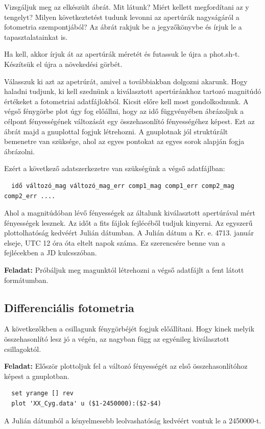 \documentclass{article}
\begin{document}
Vizsgáljuk meg az elkészült ábrát. Mit látunk? Miért kellett megfordítani az y
tengelyt? Milyen következtetést tudunk levonni az apertúrák nagyságáról a
fotometria szempontjából? Az ábrát rakjuk be a jegyzőkönyvbe és írjuk le a
tapasztalatainkat is.

Ha kell, akkor írjuk át az apertúrák méretét és futassuk le újra a phot.sh-t.
Készítsük el újra a növekedési görbét.

Válasszuk ki azt az apetrúrát, amivel a továbbiakban dolgozni akarunk.
Hogy haladni tudjunk, ki kell szednünk a kiválasztott apertúránkhoz tartozó
magnitúdó értékeket a fotometriai adatfájlokból.
Kicsit előre kell most gondolkodnunk. A végső fénygörbe plot úgy fog előállni,
hogy az idő függvényében ábrázoljuk a célpont fényességének változását egy
összehasonlító fényességéhez képest. Ezt az ábrát majd a gnuplottal fogjuk
létrehozni. A gnuplotnak jól struktúrált bemenetre van szüksége, ahol az egyes
pontokat az egyes sorok alapján fogja ábrázolni.

Ezért a következő adatszerkezetre van szükségünk a végső adatfájlban:
\begin{verbatim}
  idő változó_mag változó_mag_err comp1_mag comp1_err comp2_mag comp2_err ....
\end{verbatim}

Ahol a magnitúdóban lévő fényességek az általunk kiválasztott apertúrával mért
fényességek lesznek.
Az időt a fits fájlok fejlécéből tudjuk kinyerni. Az egyszerű plottolhatóság
kedvéért Julián dátumban. A Julián dátum a Kr. e. 4713. január elseje, UTC 12
óra óta eltelt napok száma. Ez szerencsére benne van a fejlécekben a JD
kulcsszóban.

{\bf Feladat:}
Próbáljuk meg magunktól létrehozni a végső adatfájlt a fent látott formátumban.

\subsection{Differenciális fotometria}

A következőkben a csillagunk fénygörbéjét fogjuk előállítani. Hogy kinek melyik
összehasonlító lesz jó a végén, az nagyban függ az egyénileg kiválasztott
csillagoktól.

{\bf Feladat:}
Először plottoljuk fel a változó fényességét az első összehasonlítóhoz képest a
gnuplotban.

\begin{verbatim}
  set yrange [] rev
  plot 'XX_Cyg.data' u ($1-2450000):($2-$4)
\end{verbatim}
A Julián dátumból a kényelmesebb leolvashatóság kedvéért vontuk le a 2450000-t.
\end{document}

